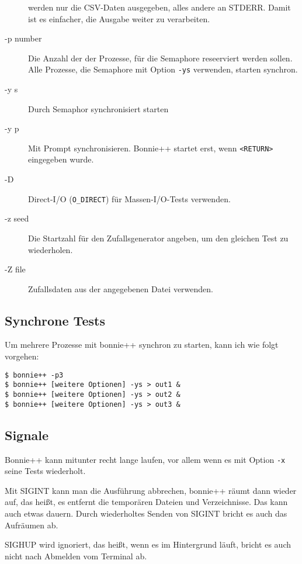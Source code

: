 \begin{normaltext}
\begin{description}
      werden nur die CSV-Daten ausgegeben, alles andere an STDERR. Damit ist
      es einfacher, die Ausgabe weiter zu verarbeiten.
    \item[-p number] Die Anzahl der der Prozesse, für die Semaphore
      reseerviert werden sollen. Alle Prozesse, die Semaphore mit Option
      \verb?-ys? verwenden, starten synchron.
    \item[-y s] Durch Semaphor synchronisiert starten
    \item[-y p] Mit Prompt synchronisieren. Bonnie++ startet erst, wenn
      \verb?<RETURN>? eingegeben wurde.
    \item[-D] Direct-I/O (\verb?O_DIRECT?) für Massen-I/O-Tests verwenden.
    \item[-z seed] Die Startzahl für den Zufallsgenerator angeben, um den
      gleichen Test zu wiederholen.
    \item[-Z file] Zufallsdaten aus der angegebenen Datei verwenden.
  \end{description}

  \subsection*{Synchrone Tests}
  Um mehrere Prozesse mit bonnie++ synchron zu starten, kann ich wie folgt
  vorgehen:
  \begin{verbatim}
$ bonnie++ -p3
$ bonnie++ [weitere Optionen] -ys > out1 &
$ bonnie++ [weitere Optionen] -ys > out2 &
$ bonnie++ [weitere Optionen] -ys > out3 &
  \end{verbatim}

  \subsection*{Signale}
  Bonnie++ kann mitunter recht lange laufen, vor allem wenn es mit Option
  \verb?-x?  seine Tests wiederholt.

  Mit SIGINT kann man die Ausführung abbrechen, bonnie++ räumt dann wieder
  auf, das heißt, es entfernt die temporären Dateien und Verzeichnisse. Das
  kann auch etwas dauern. Durch wiederholtes Senden von SIGINT bricht es auch
  das Aufräumen ab.

  SIGHUP wird ignoriert, das heißt, wenn es im Hintergrund läuft, bricht es
  auch nicht nach Abmelden vom Terminal ab.
\end{normaltext}

